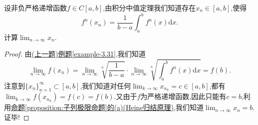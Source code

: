 \documentclass[../../main.tex]{subfiles}
\begin{document}
\begin{example}
设非负严格递增函数\(f \in C[a,b]\),由积分中值定理我们知道存在\(x_n \in [a,b]\),使得
\[
f^n(x_n) = \frac{1}{b - a} \int_{a}^{b} f^n(x)\mathrm{d}x.
\]
计算\(\lim_{n \to \infty} x_n\).
\end{example}
\begin{proof}
由\hyperref[example-3.31]{(上一题)例题\ref{example-3.31}},我们知道
\[
\lim_{n \to \infty} f(x_n) = \lim_{n \to \infty} \sqrt[n]{\frac{1}{b - a}} \cdot \lim_{n \to \infty} \sqrt[n]{\int_{a}^{b} f^n(x)\mathrm{d}x} = f(b).
\]
注意到\(\{x_n\}_{n = 1}^{\infty} \subset [a,b]\),我们知道对任何\(\lim_{k \to \infty} x_{n_k} = c \in [a,b]\),都有\(\lim_{k \to \infty} f(x_{n_k}) = f(c) = f(b)\).又由于$f$为严格递增函数,因此只能有\(c = b\),利用\hyperref[proposition:子列极限命题]{命题\ref{proposition:子列极限命题}的(a)(Heine归结原理)},我们知道\(\lim_{n \to \infty} x_n = b\).证毕!

\end{proof}
\end{document}
